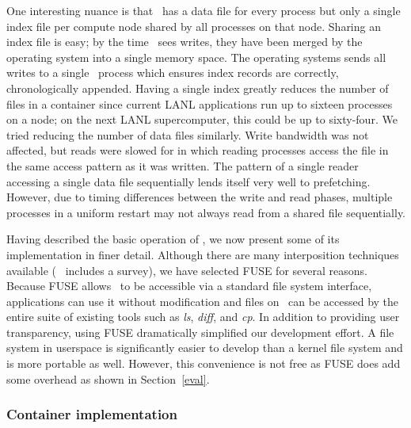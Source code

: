 
One interesting nuance is that \plfs\ has a data file for every process but
only a single index file per compute node shared by all processes on that node.
Sharing an index file is easy; by the time \plfs\ sees writes, they have been
merged by the operating system into a single memory space. The operating
systems sends all writes to a single \plfs\ process which ensures index records
are correctly, chronologically appended.  Having a single index greatly reduces
the number of files in a container since current LANL applications run up to
sixteen processes on a node; on the next LANL supercomputer, this could be up
to sixty-four. We tried reducing the number of data files similarly.
Write bandwidth was not affected, but reads were slowed for  in which reading processes access the file in the same access pattern
as it was written.  The pattern of a single reader accessing a single data file
sequentially lends itself very well to prefetching.  However, due to timing
differences between the write and read phases, multiple processes in a uniform
restart may not always read from a shared file sequentially.

Having described the basic operation of \plfs, we now present some of its
implementation in finer detail.  Although there are many interposition
techniques available (~\cite{bypass} includes a survey), we have selected FUSE
for several reasons. Because FUSE allows \plfs\ to be accessible via a standard
file system interface, applications can use it without modification and files on
\plfs\ can be accessed by the entire suite of existing tools such as
\textit{ls}, \textit{diff}, and \textit{cp}. In addition to providing user
transparency, using FUSE dramatically simplified our development effort. A file
system in userspace is significantly easier to develop than a kernel file
system and is more portable as well. However, this convenience is not free as
FUSE does add some overhead as shown in Section~\ref{eval}. 

\subsubsection{Container implementation}


